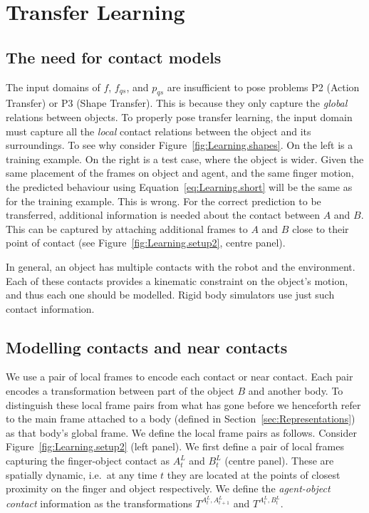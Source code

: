
\section{Transfer Learning}
\label{sec:InfoForPrediction}

\subsection{The need for contact models}
The input domains of $f$, $f_{qs}$, and $p_{qs}$ are insufficient to pose problems P2 (Action Transfer) or P3 (Shape Transfer). This is because they only capture the {\em global} relations between objects. To properly pose transfer learning, the input domain must capture all the {\em local} contact relations between the object and its surroundings.  To see why consider Figure~\ref{fig:Learning.shapes}. On the left is a training example. On the right is a test case, where the object is wider. Given the same placement of the frames on object and agent, and the same finger motion, the predicted behaviour using Equation~\eqref{eq:Learning.short} will be the same as for the training example. This is wrong. For the correct prediction to be transferred, additional information is needed about the contact between $A$ and $B$. This can be captured by attaching additional frames to $A$ and $B$ close to their point of contact (see Figure~\ref{fig:Learning.setup2}, centre panel).

In general, an object has multiple contacts with the robot and the environment. Each of these contacts provides a kinematic constraint on the object's motion, and thus each one should be modelled. Rigid body simulators use just such contact information.

\subsection{Modelling contacts and near contacts} 
We use a pair of local frames to encode each contact or near contact. Each pair encodes a transformation between part of the object $B$ and another body.  To distinguish these local frame pairs from what has gone before we henceforth refer to the main frame attached to a body (defined in Section~\ref{sec:Representations}) as that body's global frame. We define the local frame pairs as follows. Consider Figure~\ref{fig:Learning.setup2}  (left panel). We first define a pair of local frames capturing the finger-object contact as $A^{L}_{t}$ and $B^{L}_{t}$ (centre panel). These are spatially dynamic, i.e.\ at any time $t$ they are located at the points of closest proximity on the finger and object respectively.  We define the \textit{agent-object contact}
information as the transformations $T^{A^{L}_{t}, A^{L}_{t+1}}$ and $T^{A^{L}_t, B^{L}_t}$.

